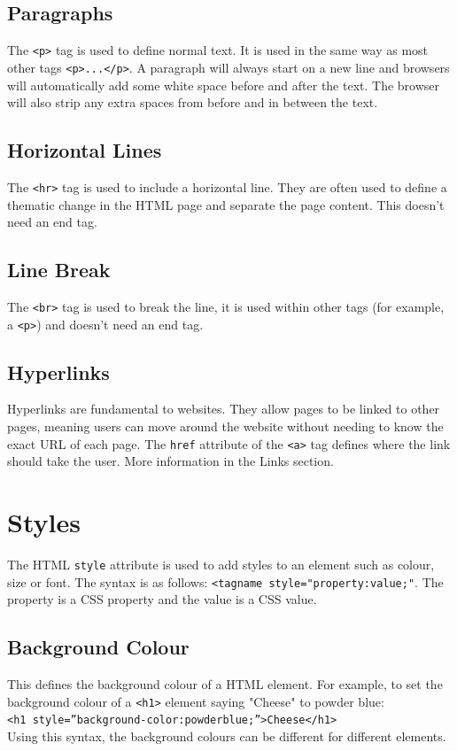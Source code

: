 \documentclass{thomasClass}
\begin{document}
\subsection{Paragraphs}
The \verb|<p>| tag is used to define normal text. It is used in the same way as most other tags \verb|<p>...</p>|. A paragraph will always start on a new line and browsers will automatically add some white space before and after the text. The browser will also strip any extra spaces from before and in between the text.
\subsection{Horizontal Lines}
The \verb|<hr>| tag is used to include a horizontal line. They are often used to define a thematic change in the HTML page and separate the page content. This doesn't need an end tag.
\subsection{Line Break}
The \verb|<br>| tag is used to break the line, it is used within other tags (for example, a \verb|<p>|) and doesn't need an end tag.
\subsection{Hyperlinks}
Hyperlinks are fundamental to websites. They allow pages to be linked to other pages, meaning users can move around the website without needing to know the exact URL of each page. The \verb|href| attribute of the \verb|<a>| tag defines where the link should take the user. More information in the Links section.

\section{Styles}
\label{sec:styles}
The HTML \verb|style| attribute is used to add styles to an element such as colour, size or font. The syntax is as follows: \verb|<tagname style="property:value;"|. The property is a CSS property and the value is a CSS value. 
\subsection{Background Colour}
This defines the background colour of a HTML element. For example, to set the background colour of a \verb|<h1>| element saying "Cheese" to powder blue:\\
\verb|<h1 style=”background-color:powderblue;”>Cheese</h1>|\\
Using this syntax, the background colours can be different for different elements.
\end{document}

